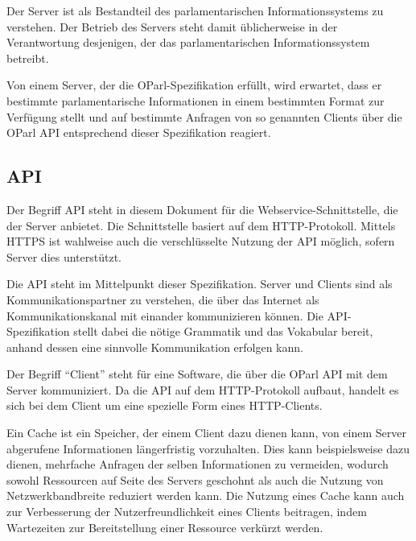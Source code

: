 \documentclass[,a4paper]{article}
\begin{document}
Der Server ist als Bestandteil des parlamentarischen Informationssystems
zu verstehen. Der Betrieb des Servers steht damit üblicherweise in der
Verantwortung desjenigen, der das parlamentarischen Informationssystem
betreibt.

Von einem Server, der die OParl-Spezifikation erfüllt, wird erwartet,
dass er bestimmte parlamentarische Informationen in einem bestimmten
Format zur Verfügung stellt und auf bestimmte Anfragen von so genannten
Clients über die OParl API entsprechend dieser Spezifikation reagiert.

\subsection{API}\label{api}

Der Begriff API steht in diesem Dokument für die
Webservice-Schnittstelle, die der Server anbietet. Die Schnittstelle
basiert auf dem HTTP-Protokoll. Mittels HTTPS ist wahlweise auch die
verschlüsselte Nutzung der API möglich, sofern Server dies unterstützt.

Die API steht im Mittelpunkt dieser Spezifikation. Server und Clients
sind als Kommunikationspartner zu verstehen, die über das Internet als
Kommunikationskanal mit einander kommunizieren können. Die
API-Spezifikation stellt dabei die nötige Grammatik und das Vokabular
bereit, anhand dessen eine sinnvolle Kommunikation erfolgen kann.


Der Begriff ``Client'' steht für eine Software, die über die OParl API
mit dem Server kommuniziert. Da die API auf dem HTTP-Protokoll aufbaut,
handelt es sich bei dem Client um eine spezielle Form eines
HTTP-Clients.


Ein Cache ist ein Speicher, der einem Client dazu dienen kann, von einem
Server abgerufene Informationen längerfristig vorzuhalten. Dies kann
beispielsweise dazu dienen, mehrfache Anfragen der selben Informationen
zu vermeiden, wodurch sowohl Ressourcen auf Seite des Servers geschohnt
als auch die Nutzung von Netzwerkbandbreite reduziert werden kann. Die
Nutzung eines Cache kann auch zur Verbesserung der Nutzerfreundlichkeit
eines Clients beitragen, indem Wartezeiten zur Bereitstellung einer
Ressource verkürzt werden.
\end{document}
